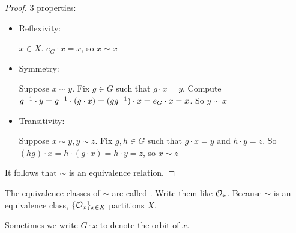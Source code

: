 \documentclass[notes.tex]{subfiles}
\begin{document}
\begin{proof} 3 properties:
	\begin{itemize}
		\item Reflexivity:

		$x\in X$. $e_G\cdot x = x$, so $x\sim x$
		\item Symmetry:

		Suppose $x\sim y$.
		Fix $g\in G$ such that $g\cdot x = y$. Compute ${g}^{-1} \cdot y = {g}^{-1} \cdot(g\cdot x) = (g{g}^{-1})\cdot x = e_G\cdot x = x$. So $y\sim x$
		\item Transitivity:

		Suppose $x\sim y, y\sim z$.
		Fix $g, h\in G$ such that $g\cdot x = y$ and $h\cdot y = z$.
		So $(hg)\cdot x = h\cdot(g\cdot x) = h\cdot y = z$, so $x\sim z$
	\end{itemize}

	It follows that $\sim$ is an equivalence relation.
\end{proof}

\begin{defn}
	The equivalence classes of $\sim$ are called .
	Write them like $\mathcal{O}_x$. Because $\sim$ is an equivalence class, $\{\mathcal{O}_x\}_{x\in X}$ partitions $X$.
\end{defn}


\begin{notation}
	Sometimes we write $G\cdot x$ to denote the orbit of $x$.
\end{notation}
\end{document}

